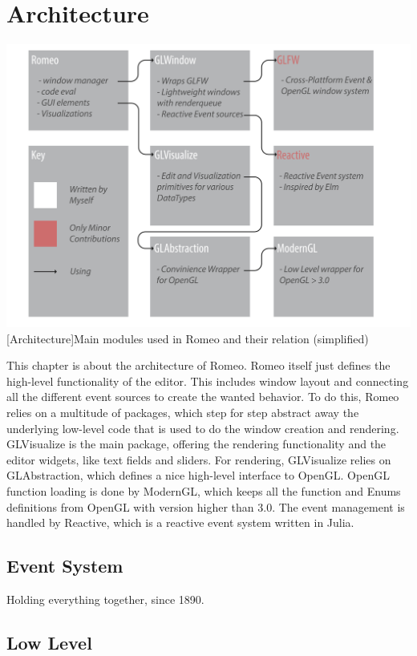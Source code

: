 \section{Architecture}

\vspace{1em}
\begin{minipage}{\linewidth}
    \centering
    \includegraphics[width=0.9\linewidth]{graphics/architecture.pdf}
    [Architecture]{Main modules used in Romeo and their relation (simplified)}
    \label{fig:architecture} 
\end{minipage}
This chapter is about the architecture of Romeo.
Romeo itself just defines the high-level functionality of the editor.
This includes window layout and connecting all the different event sources to create the wanted behavior.
To do this, Romeo relies on a multitude of packages, which step for step abstract away the underlying low-level code that is used to do the window creation and rendering.
GLVisualize is the main package, offering the rendering functionality and the editor widgets, like text fields and sliders.
For rendering, GLVisualize relies on GLAbstraction, which defines a nice high-level interface to OpenGL.
OpenGL function loading is done by ModernGL, which keeps all the function and Enums definitions from OpenGL with version higher than 3.0.
The event management is handled by Reactive, which is a reactive event system written in Julia.

\subsection{Event System}
Holding everything together, since 1890.
\subsection{Low Level}

